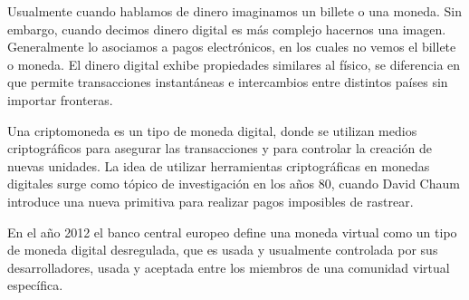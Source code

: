 \begin{intro}
Usualmente cuando hablamos de dinero imaginamos un billete o una moneda. Sin
  embargo, cuando decimos dinero digital es m\'as complejo hacernos una imagen.
  Generalmente lo asociamos a pagos electr\'onicos, en los cuales no vemos el
  billete o moneda. El dinero digital exhibe propiedades similares al f\'isico,
  se diferencia en que permite transacciones instant\'aneas e intercambios
  entre distintos pa\'ises sin importar fronteras.
  
Una criptomoneda es un tipo de moneda digital, donde se utilizan medios
  criptogr\'aficos para asegurar las transacciones y para controlar la
  creaci\'on de nuevas unidades. La idea de utilizar herramientas
  criptogr\'aficas en monedas digitales surge como t\'opico de
  investigaci\'on en los a\~nos 80, cuando David Chaum \cite{chaum1983blind}
  introduce una nueva primitiva para realizar pagos imposibles de rastrear.
  
En el a\~no 2012 el banco central europeo \cite{bcentraleuro} define una moneda
  virtual como un tipo de moneda digital desregulada, que es usada y usualmente
  controlada por sus desarrolladores, usada y aceptada entre los miembros de una
  comunidad virtual espec\'ifica.
\end{intro}